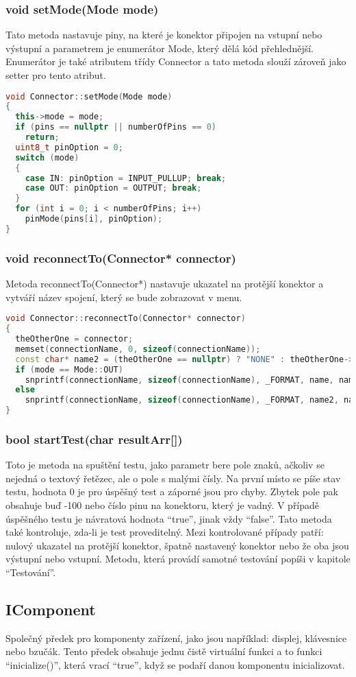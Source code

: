 \subsubsection{void setMode(Mode mode)}
Tato metoda nastavuje piny, na které je konektor připojen na vstupní nebo výstupní a parametrem je enumerátor Mode, který dělá kód přehlednější. Enumerátor je také atributem třídy Connector a tato metoda slouží zároveň jako setter pro tento atribut.
\begin{lstlisting}[language=C++, caption={Metoda setMode(Mode)}, label={lst:cpp_method}]
void Connector::setMode(Mode mode)
{
  this->mode = mode;
  if (pins == nullptr || numberOfPins == 0)
    return;
  uint8_t pinOption = 0;
  switch (mode)
  {
    case IN: pinOption = INPUT_PULLUP; break;
    case OUT: pinOption = OUTPUT; break;
  }
  for (int i = 0; i < numberOfPins; i++)
    pinMode(pins[i], pinOption);   
}
\end{lstlisting}

\subsubsection{void reconnectTo(Connector* connector)}
Metoda reconnectTo(Connector*) nastavuje ukazatel na protější konektor a vytváří název spojení, který se bude zobrazovat v menu.
\begin{lstlisting}[language=C++, caption={Metoda reconnectTo(Connector*)}, label={lst:cpp_method}]
void Connector::reconnectTo(Connector* connector)
{
  theOtherOne = connector;
  memset(connectionName, 0, sizeof(connectionName));
  const char* name2 = (theOtherOne == nullptr) ? "NONE" : theOtherOne->getName();
  if (mode == Mode::OUT)
    snprintf(connectionName, sizeof(connectionName), _FORMAT, name, name2);
  else
    snprintf(connectionName, sizeof(connectionName), _FORMAT, name2, name);
}
\end{lstlisting}

\subsubsection{bool startTest(char resultArr[])}
Toto je metoda na spuštění testu, jako parametr bere pole znaků, ačkoliv se nejedná o textový řetězec, ale o pole s malými čísly. Na první místo se píše stav testu, hodnota 0 je pro úspěšný test a záporné jsou pro chyby. Zbytek pole pak obsahuje buď -100 nebo číslo pinu na konektoru, který je vadný. V případě úspěšného testu je návratová hodnota “true”, jinak vždy “false”. Tato metoda také kontroluje, zda-li je test proveditelný. Mezi kontrolované případy patří: nulový ukazatel na protější konektor, špatně nastavený konektor nebo že oba jsou výstupní nebo vstupní. Metodu, která provádí samotné testování popíši v kapitole “Testování”.

\subsection{IComponent}
Společný předek pro komponenty zařízení, jako jsou například: displej, klávesnice nebo bzučák. Tento předek obsahuje jednu čistě virtuální funkci a to funkci “inicialize()”, která vrací “true”, když se podaří danou komponentu inicializovat.
